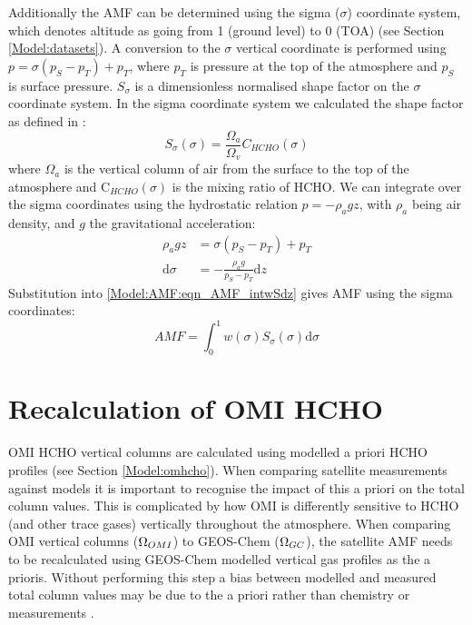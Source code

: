   Additionally the AMF can be determined using the sigma ($\sigma$) coordinate system, which denotes altitude as going from 1 (ground level) to 0 (TOA) (see Section \ref{Model:datasets}).
  A conversion to the $\sigma$ vertical coordinate is performed using $p = \sigma (p_S - p_T) + p_T$, where $p_T$ is pressure at the top of the atmosphere and $p_S$ is surface pressure. 
  $S_\sigma$ is a dimensionless normalised shape factor on the $\sigma$ coordinate system.
  In the sigma coordinate system we calculated the shape factor as defined in \textcite{Palmer2001}:
  \begin{equation}
    \label{Model:AMF:eqn_ShapeFactorSigma}
    S_\sigma(\sigma) = \frac{\Omega_a}{\Omega_v}C_{HCHO}(\sigma)
  \end{equation}
  where $\Omega_a$ is the vertical column of air from the surface to the top of the atmosphere and C$_{HCHO}(\sigma)$ is the mixing ratio of HCHO.
  We can integrate over the sigma coordinates using the hydrostatic relation $p = - \rho_a g z$, with $\rho_a$ being air density, and $g$ the gravitational acceleration:
  \begin{align*}
    \rho_a g z & = \sigma \left( p_S - p_T \right) + p_T \\
    \mathrm{d}\sigma  & = - \frac{ \rho_a g }{ p_S - p_T } \mathrm{d}z
  \end{align*}
  Substitution into \ref{Model:AMF:eqn_AMF_intwSdz} gives AMF using the sigma coordinates:
  \begin{equation} \label{Model:AMF:eqn_AMFintwSdsigma}
    AMF = \int_0^1 w(\sigma) S_\sigma(\sigma) \mathrm{d}\sigma
  \end{equation}

\section{Recalculation of OMI HCHO}
  \label{Model:omiRecalc}
  
  
  OMI HCHO vertical columns are calculated using modelled a priori HCHO profiles (see Section \ref{Model:omhcho}).
  When comparing satellite measurements against models it is important to recognise the impact of this a priori on the total column values.
  This is complicated by how OMI is differently sensitive to HCHO (and other trace gases) vertically throughout the atmosphere.
  When comparing OMI vertical columns ($\Omega_{OMI}$) to GEOS-Chem ($\Omega_{GC}$), the satellite AMF needs to be recalculated using GEOS-Chem modelled vertical gas profiles as the a prioris.
  Without performing this step a bias between modelled and measured total column values may be due to the a priori rather than chemistry or measurements \parencite{Palmer2001, Lamsal2014}.
  
